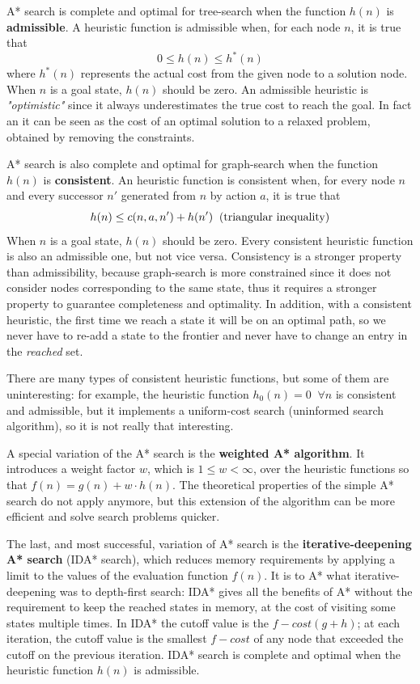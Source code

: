 \documentclass{article}
\begin{document}
A* search is complete and optimal for tree-search when the function \(h(n)\) is \textbf{admissible}. A heuristic function is admissible when, for each node \(n\), it is true that 
    \[0 \le h(n) \le h^*(n)\]
where \(h^*(n)\) represents the actual cost from the given node to a solution node. When \(n\) is a goal state, \(h(n)\) should be zero. An admissible heuristic is \textit{"optimistic"} since it always underestimates the true cost to reach the goal. In fact an it can be seen as the cost of an optimal solution to a relaxed problem, obtained by removing the constraints.

A* search is also complete and optimal for graph-search when the function \(h(n)\) is \textbf{consistent}. An heuristic function is consistent when, for every node \(n\) and every successor \(n'\) generated from \(n\) by action \(a\), it is true that 
\[h(n)\le c(n,a,n') + h(n') \;\; \textnormal{(triangular inequality)}\]
When \(n\) is a goal state, \(h(n)\) should be zero. Every consistent heuristic function is also an admissible one, but not vice versa. Consistency is a stronger property than admissibility, because graph-search is more constrained since it does not consider nodes corresponding to the same state, thus it requires a stronger property to guarantee completeness and optimality. In addition, with a consistent heuristic, the first time we reach a state it will be on an optimal path, so we never have to re-add a state to the frontier and never have to change an entry in the \textit{reached} set.

There are many types of consistent heuristic functions, but some of them are uninteresting: for example, the heuristic function \(h_0(n) = 0 \;\; \forall n\) is consistent and admissible, but it implements a uniform-cost search (uninformed search algorithm), so it is not really that interesting.

A special variation of the A* search is the \textbf{weighted A* algorithm}. It introduces a weight factor \(w\), which is \(1 \le w < \infty\), over the heuristic functions so that \(f(n) = g(n) + w \cdot h(n)\). The theoretical properties of the simple A* search do not apply anymore, but this extension of the algorithm can be more efficient and solve search problems quicker.

The last, and most successful, variation of A* search is the \textbf{iterative-deepening A* search} (IDA* search), which reduces memory requirements by applying a limit to the values of the evaluation function \(f(n)\). It is to A* what iterative-deepening was to depth-first search: IDA* gives all the benefits of A* without the requirement to keep the reached states in memory, at the cost of visiting some states multiple times. In IDA* the cutoff value is the \(f-cost (g+h)\); at each iteration, the cutoff value is the smallest \(f-cost\) of any node that exceeded the cutoff on the previous iteration. IDA* search is complete and optimal when the heuristic function \(h(n)\) is admissible.
\end{document}
